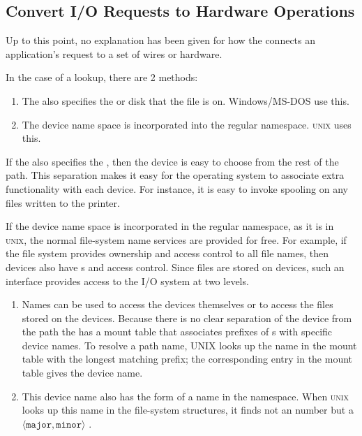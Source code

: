 \subsection{Convert I/O Requests to Hardware Operations}\label{subsec:Convert_IO_Requests_HW_Ops}
Up to this point, no explanation has been given for how the  connects an application's request to a set of wires or hardware.

In the case of a  lookup, there are 2 methods:
\begin{enumerate}[noitemsep]
\item The  also specifies the  or disk that the file is on.
  Windows/MS-DOS use this.
\item The device name space is incorporated into the regular  namespace.
  \textsc{unix} uses this.
\end{enumerate}

If the  also specifies the , then the device is easy to choose from the rest of the path.
This separation makes it easy for the operating system to associate extra functionality with each device.
For instance, it is easy to invoke spooling on any files written to the printer.

If the device name space is incorporated in the regular  namespace, as it is in \textsc{unix}, the normal file-system name services are provided for free.
For example, if the file system provides ownership and access control to all file names, then devices also have s and access control.
Since files are stored on devices, such an interface provides access to the I/O system at two levels.

\begin{enumerate}[noitemsep]
\item Names can be used to access the devices themselves or to access the files stored on the devices.
  Because there is no clear   separation of the device from the path the  has a mount table that associates prefixes of s with specific device names.
  To resolve a path name, UNIX looks up the name in the mount table with the longest matching prefix; the corresponding entry in the mount table gives the device name.

\item This device name also has the form of a name in the  namespace.
  When \textsc{unix} looks up this name in the file-system  structures, it finds not an  number but a $\langle \mathtt{major}, \mathtt{minor} \rangle$ .
\end{enumerate}


